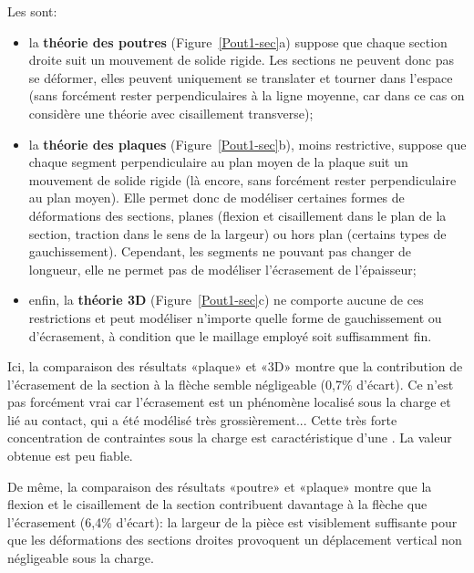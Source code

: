 \medskip
Les  sont:
\begin{itemize}
\item la \textbf{théorie des poutres} (Figure~\ref{Pout1-sec}a) suppose que chaque section droite suit un mouvement de solide rigide. Les sections ne peuvent donc pas se déformer, elles peuvent uniquement se translater et tourner dans l'espace (sans forcément rester perpendiculaires à la ligne moyenne, car dans ce cas on considère une théorie avec cisaillement transverse);
\item la \textbf{théorie des plaques} (Figure~\ref{Pout1-sec}b), moins restrictive, suppose que chaque segment perpendiculaire au plan moyen de la plaque suit un mouvement de solide rigide (là encore, sans forcément rester perpendiculaire au plan moyen). Elle permet donc de modéliser certaines formes de déformations des sections, planes (flexion et cisaillement dans le plan de la section, traction dans le sens de la largeur) ou hors plan (certains types de gauchissement). Cependant, les segments ne pouvant pas changer de longueur, elle ne permet pas de modéliser l'écrasement de l'épaisseur;
\item enfin, la \textbf{théorie 3D} (Figure~\ref{Pout1-sec}c) ne comporte aucune de ces restrictions et peut modéliser n'importe quelle forme de gauchissement ou d'écrasement, à condition que le maillage employé soit suffisamment fin.
\end{itemize}

\medskip
Ici, la comparaison des résultats «plaque» et «3D» montre que la contribution de l'écrasement de la section à la flèche semble négligeable (0,7\% d'écart). Ce n'est pas forcément vrai car l'écrasement est un phénomène localisé sous la charge et lié au contact, qui a été modélisé très grossièrement... Cette très forte concentration de contraintes sous la charge est caractéristique d'une . La valeur obtenue est peu fiable. 

De même, la comparaison des résultats «poutre» et «plaque» montre que la flexion et le cisaillement de la section contribuent davantage à la flèche que l'écrasement (6,4\% d'écart): la largeur de la pièce est visiblement suffisante pour que les déformations des sections droites provoquent un déplacement vertical non négligeable sous la charge.

